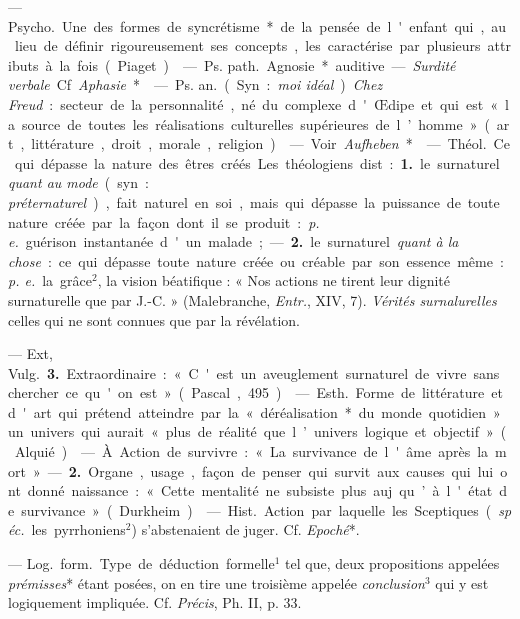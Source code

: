 \begin{itemize}[leftmargin=1cm, label=, itemsep=1pt]
 — \si{Psycho.} Une des formes de syncrétisme* de la
pensée de l'enfant qui, au lieu de définir rigoureusement ses concepts, les
caractérise par plusieurs attributs à la fois (Piaget).

 — \si{Ps. path.} Agnosie* auditive. — {\it Surdité
verbale}. Cf. {\it Aphasie}*.

 — \si{Ps. an.} (Syn. : {\it moi idéal}). {\it Chez Freud} :
secteur de la personnalité, né du complexe d'Œdipe et qui est « la source de
toutes les réalisations culturelles supérieures de l’homme » (art,
littérature, droit, morale, religion).

 — Voir {\it Aufheben}*.

 — \si{Théol.} Ce qui dépasse la nature des êtres créés. Les
théologiens dist. : {\bf 1.} le surnaturel {\it quant au mode} (syn. : {\it
préternaturel}), fait naturel en soi, mais qui dépasse la puissance de toute
nature créée par la façon dont il se produit : {\it p. e.} guérison
instantanée d'un malade; — {\bf 2.} le surnaturel {\it quant à la chose} :
ce qui dépasse toute nature créée ou créable par son essence même :
{\it p. e.} la grâce$^2$, la vision béatifique : « Nos actions ne tirent
leur dignité surnaturelle que par J.-C. » (Malebranche, {\it Entr.}, XIV,
7). {\it Vérités surnalurelles} celles qui ne sont connues que par la
révélation.

— Ext, \si{Vulg.} {\bf 3.} Extraordinaire : « C'est un aveuglement
surnaturel de vivre sans chercher ce qu'on est » (Pascal, 495).

 — \si{Esth.} Forme de littérature et d'art qui prétend
atteindre par la « déréalisation* du monde quotidien » un univers qui aurait
« plus de réalité que l’univers logique et objectif » (Alquié).

 — À. Action de survivre : « La survivance de l'âme après la
mort » — {\bf 2.} Organe, usage, façon de penser qui survit aux causes qui
lui ont donné naissance : « Cette mentalité ne subsiste plus auj. qu’à
l'état de survivance » (Durkheim).

 — \si{Hist.} Action par laquelle les Sceptiques
({\it spéc.} les pyrrhoniens$^2$) s’abstenaient de juger. Cf. {\it Epoché}*.

 — \si{Log.} \si{form.} Type de déduction formelle$^1$ tel
que, deux propositions appelées {\it prémisses}* étant posées, on en tire
une troisième appelée {\it conclusion}$^3$ qui y est logiquement impliquée.
Cf. {\it Précis}, Ph. II, p. 33.


\end{itemize}
